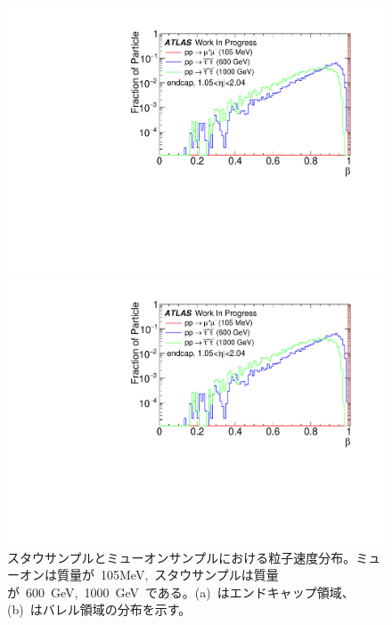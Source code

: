 \begin{figure}[H]
    \begin{minipage}{0.49\hsize}
    \centering   
    \includegraphics[width=\textwidth,page=1]{img/plot/beta.pdf}
    \subcaption{}
    \end{minipage}
    \begin{minipage}{0.49\hsize}
    \centering   
    \includegraphics[width=\textwidth,page=5]{img/plot/beta.pdf}
    \subcaption{}
    \end{minipage}
    \caption[スタウサンプルとミューオンサンプルにおける粒子速度分布]{スタウサンプルとミューオンサンプルにおける粒子速度分布。ミューオンは質量が~105MeV,~スタウサンプルは質量が~600~GeV,~1000~GeV~である。(a)~はエンドキャップ領域、(b)~はバレル領域の分布を示す。}\label{fig:staud2}
\end{figure}

